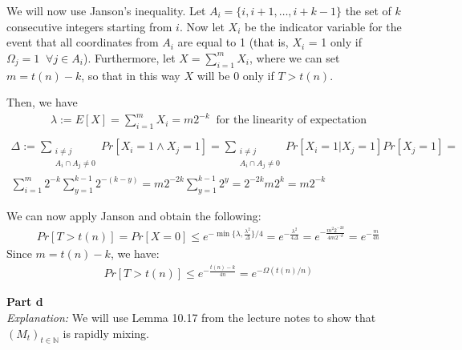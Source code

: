\documentclass[a4paper,german]{article}
\begin{document}
We will now use Janson's inequality.
Let $A_i = \{i, i+1, \ldots , i+k-1\}$ the set of $k$ consecutive integers starting from $i$.
Now let $X_i$ be the indicator variable for the event that all coordinates from $A_i$ are
equal to 1 (that is, $X_i$ = 1 only if $\Omega_j = 1 \;\; \forall j \in A_i$). Furthermore,
let $X = \sum_{i=1}^m X_i$, where we can set $m = t(n) - k$, so that in this way $X$ will 
be 0 only if $T > t(n)$.

Then, we have
\begin{align*}
 \lambda := E[X] =  \sum_{i=1}^m X_i = m2^{-k} \;\; \text{for the linearity of expectation}\\
\end{align*}
\begin{align*}
	\Delta := \sum_{\substack{i\neq j \\ A_i \cap A_j \neq 0}} Pr[X_i = 1 \wedge X_j = 1] =
	\sum_{\substack{i\neq j \\ A_i \cap A_j \neq 0}} Pr[X_i = 1|X_j = 1]Pr[X_j = 1] = \\
	\sum_{i=1}^m 2^{-k} \sum_{y=1}^{k - 1} 2^{-(k-y)} = m2^{-2k}\sum_{y=1}^{k-1}2^y = 2^{-2k}m2^k =
	m2^{-k}
\end{align*}

We can now apply Janson and obtain the following:
\begin{align*}
	Pr[ T > t(n)] = Pr[X = 0] \leq e ^ {-\min\{\lambda, \frac{\lambda^2}{\Delta}\}/4} = 
	e^{-\frac{\lambda^2}{4\Delta}} = e ^ {- \frac{m^2 2^{-2k}}{4m 2^{-k}}} = e^{- \frac{m}{4n}}
\end{align*}
Since $m = t(n) - k$, we have:
\begin{align*}
	Pr[ T > t(n)] \leq e ^ {-\frac{t(n) - k}{4n}} =  e^{- \Omega(t(n)/n)}
\end{align*}


\vspace{1em}
\noindent 
\textbf{Part d} \\
\emph{Explanation:} We will use Lemma 10.17 from the lecture notes to show that $(M_t)_{t \in \mathbb{N}}$ is rapidly mixing.
\end{document}
